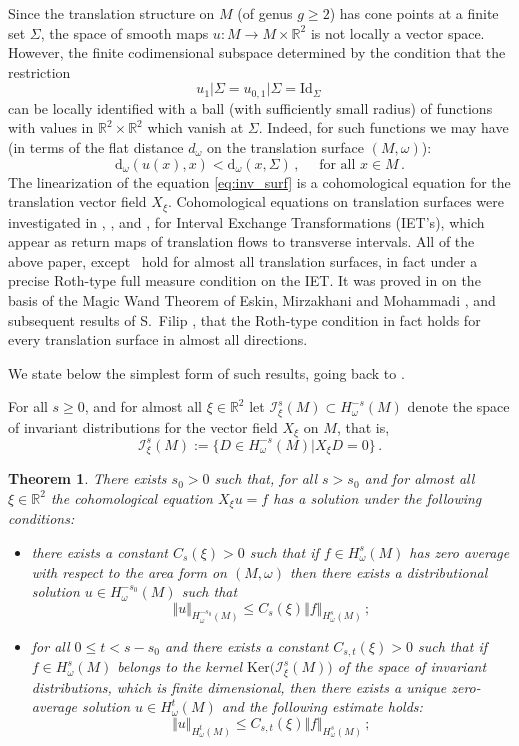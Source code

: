 \documentclass[11pt]{amsart}
\newcommand \R {{ \mathbb R}}
\newtheorem{theorem}{Theorem}[section]
\begin{document}
Since the translation structure on $M$ (of genus $g\geq 2$) has cone points at a finite set $\Sigma$, the space of smooth maps $u : M \to M \times \R^2$ is not locally a vector
space. However, the finite codimensional  subspace determined by the condition that the restriction
$$
u_1 \vert \Sigma = u_{0,1} \vert \Sigma = \text{Id}_\Sigma \,
$$
can be locally identified with a  ball  (with sufficiently small radius) of functions with values in $\R^2 \times \R^2$ which vanish at $\Sigma$. Indeed, for such 
functions we may have (in terms of the flat distance $d_\omega$ on the translation surface $(M,\omega)$):
$$
\text{d}_\omega ( u(x), x ) <  \text{d}_\omega ( x, \Sigma)\,, \quad \text{ for all } x \in M\,.
$$
The  linearization of the equation \eqref{eq:inv_surf} is a cohomological equation for the translation vector field  $X_\xi$. Cohomological equations
on translation surfaces were investigated in \cite{F97}, \cite{F21},  and \cite{MMY05}, \cite{MY16} for Interval Exchange Transformations (IET's), which appear 
as return maps of translation flows to transverse intervals. All of the above paper, except~\cite{F97} hold for almost all translation surfaces, in fact under a precise 
Roth-type full measure condition on the IET.  It was proved in \cite{CE15} on the basis of the Magic Wand Theorem of Eskin, Mirzakhani and Mohammadi  \cite{EM18},
\cite{EMM15} and  subsequent results of S.~Filip \cite{Fil16}, that the Roth-type condition in fact holds for every translation surface in almost all directions.

We state below the simplest form of such results, going back to \cite{F97}. 

For all $s\geq 0$, and for almost all $\xi \in \R^2$ let $\mathcal  I^s_\xi (M) \subset H^{-s}_\omega (M)$ denote the space of invariant distributions for the vector field $X_\xi$ on $M$,
that is,
$$
\mathcal  I^s_\xi (M) := \{ D \in H^{-s}_\omega (M) \vert X_\xi D =0 \}\,.
$$
\begin{theorem} \cite{F97}  \label{thm:CE} There exists $s_0 >0$ such that, for all $s >s_0$ and for almost all $\xi \in \R^2$  the cohomological
equation $X_\xi u =f$ has a solution under the following conditions:
\begin{itemize}
\item  there exists a constant $C_{s}(\xi) >0$ such that  if $f \in H^s_\omega(M)$  has zero average with respect to the area form on $(M, \omega)$ then there exists a distributional solution $u \in H^{-s_0}_\omega (M)$ such that
$$
\Vert u \Vert_{H^{-s_0}_\omega(M)} \leq C_s(\xi)    \Vert f \Vert _{H^{s}_\omega(M)} \,;
$$
\item for all $0\leq t <s-s_0$ and there exists a constant $C_{s,t}(\xi) >0$ such that if $f \in H^s_\omega(M)$ belongs to the kernel $\text{Ker} \Big(\mathcal  I^s_\xi (M) \Big)$ of the 
space of invariant distributions, which is finite dimensional, then there exists a  unique zero-average solution $u\in H^t_\omega(M)$  and the following estimate holds:
$$
\Vert u \Vert_{H^{t}_\omega(M)} \leq C_{s,t} (\xi)    \Vert f \Vert _{H^{s}_\omega(M)} \,;
$$
\end{itemize} 
\end{theorem} 
\end{document}
